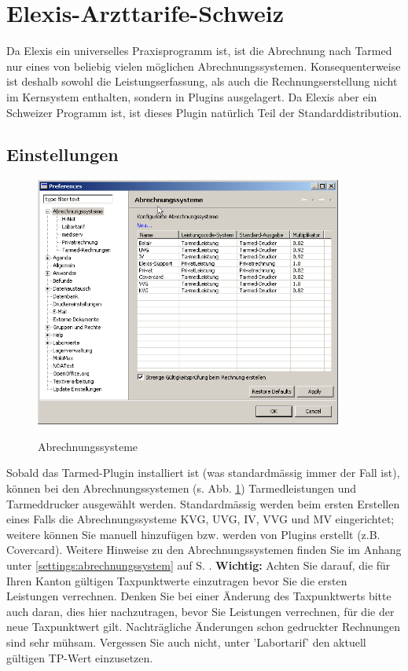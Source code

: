 \section{Elexis-Arzttarife-Schweiz}
\label{arzttarife}
Da Elexis ein universelles Praxisprogramm ist, ist die Abrechnung nach Tarmed nur eines von beliebig vielen
möglichen Abrechnungssystemen. Konsequenterweise ist deshalb sowohl die Leistungserfassung, als auch die
Rechnungserstellung nicht im Kernsystem enthalten, sondern in Plugins ausgelagert.
Da Elexis aber ein Schweizer Programm ist, ist dieses Plugin natürlich Teil der
Standarddistribution.
\subsection{Einstellungen}
\begin{figure}
  \center
  \includegraphics[width=0.9\textwidth]{images/arztrechnung1}\\
  \caption{Abrechnungssysteme}\label{fig:tarmed1}
\end{figure}

Sobald das Tarmed-Plugin installiert ist (was standardmässig immer der Fall ist), können bei den Abrechnungssystemen (s. Abb. \ref{fig:tarmed1}) Tarmedleistungen und Tarmeddrucker ausgewählt werden. Standardmässig werden beim ersten Erstellen eines Falls die Abrechnungssysteme KVG, UVG, IV, VVG und MV eingerichtet; weitere können Sie manuell hinzufügen bzw. werden von Plugins erstellt (z.B. Covercard). Weitere Hinweise zu den Abrechnungssystemen finden Sie im Anhang unter \ref{settings:abrechnungssystem} auf S. \pageref{settings:abrechnungssystem}. \textbf{Wichtig:} Achten Sie darauf, die für Ihren Kanton gültigen Taxpunktwerte einzutragen bevor Sie die ersten Leistungen verrechnen. Denken Sie bei einer Änderung des Taxpunktwerts bitte auch daran, dies hier nachzutragen, bevor Sie Leistungen verrechnen, für die der neue Taxpunktwert gilt. Nachträgliche Änderungen schon gedruckter Rechnungen sind sehr mühsam. Vergessen Sie auch nicht, unter 'Labortarif' den aktuell gültigen TP-Wert einzusetzen.

